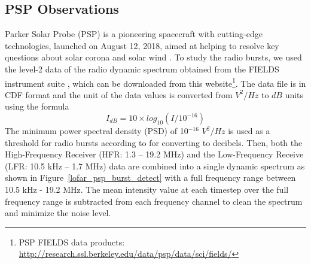 \subsection{PSP Observations}
Parker Solar Probe (PSP) is a pioneering spacecraft with cutting-edge technologies, launched on August 12, 2018, aimed at helping to resolve key questions about solar corona and solar wind \citep{fox_2016}.
To study the radio bursts, we used the level-2 data of the radio dynamic spectrum obtained from the FIELDS instrument suite \citep{bale16, pulupa17}, which can be downloaded from this website\footnote{PSP FIELDS data products: \url{http://research.ssl.berkeley.edu/data/psp/data/sci/fields/}}. The data file is in CDF format and the unit of the data values is converted from $V^2/Hz$ to $dB$ units using the formula
\begin{equation}
    I_{dB} = 10 \times log_{10}(I/10^{-16})
\end{equation}
The minimum power spectral density (PSD) of 10$^{-16}$ $V^2/Hz$ is used as a threshold for radio bursts according to \citet{pulupa_2020} for converting to decibels. Then, both the High-Frequency Receiver (HFR: 1.3 – 19.2 MHz) and the Low-Frequency Receive (LFR: 10.5 kHz – 1.7 MHz) data are combined into a single dynamic spectrum as shown in Figure~\ref{lofar_psp_burst_detect} with a full frequency range between 10.5 kHz - 19.2 MHz. The mean intensity value at each timestep over the full frequency range is subtracted from each frequency channel to clean the spectrum and minimize the noise level.

